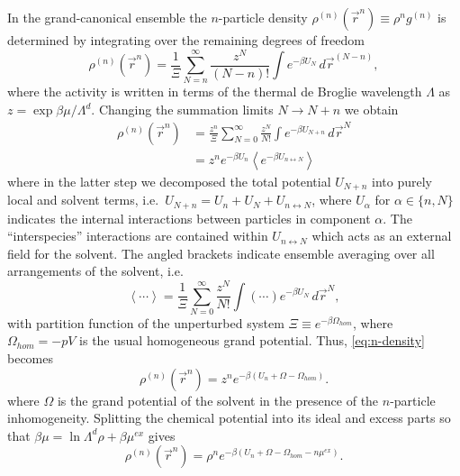 \documentclass[11pt]{report}
\begin{document}
In the grand-canonical ensemble the $n$-particle density $\rho^{(n)}(\vec{r}^n) \equiv \rho^n g^{(n)}$ is determined by integrating over the remaining degrees of freedom~\cite{Hansen2013}
\begin{equation}
  \rho^{(n)}(\vec{r}^n)
  = \frac{1}{\Xi} \sum_{N=n}^\infty \frac{z^N}{(N-n)!} \int e^{-\beta U_N} \, d\vec{r}^{(N-n)},
\end{equation}
where the activity is written in terms of the thermal de Broglie wavelength $\Lambda$ as $z = \exp{\beta\mu} / \Lambda^d$.
Changing the summation limits $N \rightarrow N+n$ we obtain
\begin{equation}\label{eq:n-density}
\begin{aligned}
  \rho^{(n)}(\vec{r}^n)
  &= \frac{z^n}{\Xi} \sum_{N=0}^\infty \frac{z^N}{N!} \int e^{-\beta U_{N+n}} \, d\vec{r}^{N} \\
 & = z^n e^{-\beta U_n} \left< e^{-\beta U_{n \leftrightarrow N}} \right>
\end{aligned}
\end{equation}
where in the latter step we decomposed the total potential $U_{N+n}$ into purely local and solvent terms, i.e.\ $U_{N+n} = U_n + U_N + U_{n \leftrightarrow N}$, where $U_\alpha$ for $\alpha \in \{n,N\}$ indicates the internal interactions between particles in component $\alpha$.
The ``interspecies'' interactions are contained within $U_{n \leftrightarrow N}$ which acts as an external field for the solvent.
The angled brackets indicate ensemble averaging over all arrangements of the solvent, i.e.\
\begin{equation}
  \left< \cdots \right> =
  \frac{1}{\Xi} \sum_{N=0}^\infty \frac{z^N}{N!} \int \left(\cdots\right) e^{-\beta U_N} \, d\vec{r}^N,
\end{equation}
with partition function of the unperturbed system $\Xi \equiv e^{-\beta \Omega_{hom}}$, where $\Omega_{hom} = -p V$ is the usual homogeneous grand potential.
Thus, \eqref{eq:n-density} becomes
\begin{equation}
  \rho^{(n)}(\vec{r}^n)
  = z^n e^{-\beta (U_n + \Omega - \Omega_{hom})}.
\end{equation}
where $\Omega$ is the grand potential of the solvent in the presence of the $n$-particle inhomogeneity.
Splitting the chemical potential into its ideal and excess parts so that $\beta\mu = \ln{\Lambda^d \rho} + \beta\mu^{ex}$ gives
\begin{equation}
  \rho^{(n)}(\vec{r}^n)
  = \rho^n e^{-\beta (U_n + \Omega - \Omega_{hom} - n\mu^{ex})}.
\end{equation}
\end{document}
